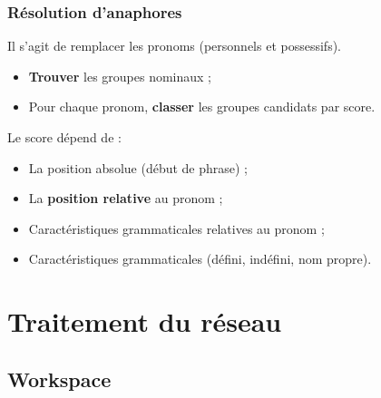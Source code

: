 \documentclass[12pt, handout]{beamer}
\begin{document}
\begin{frame}
 \frametitle{Résolution d'anaphores}
 
 Il s'agit de remplacer les pronoms (personnels et possessifs).
 
  \begin{itemize}
   \item \textbf{Trouver} les groupes nominaux ;
   \item Pour chaque pronom, \textbf{classer} les groupes candidats par score.
  \end{itemize}

  \pause
  
  Le score dépend de :
  \begin{itemize}
   \item La position absolue (début de phrase) ;
   \item La \textbf{position relative} au pronom ;
   \item Caractéristiques grammaticales relatives au pronom ;
   \item Caractéristiques grammaticales (défini, indéfini, nom propre).
  \end{itemize}

 
 
\end{frame}


\section{Traitement du réseau}

\subsection{Workspace}
\end{document}
